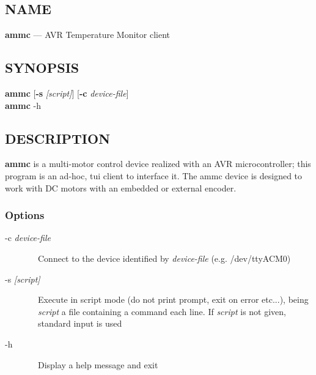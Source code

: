 \subsection*{NAME}
\textbf{ammc} — AVR Temperature Monitor client

\subsection*{SYNOPSIS}
\textbf{ammc} [\textbf{-s} \emph{[script]}] [\textbf{-c} \emph{device-file}] \\
\textbf{ammc} -h

\subsection*{DESCRIPTION}
\textbf{ammc} is a multi-motor control device realized with an AVR microcontroller;
this program is an ad-hoc, tui client to interface it.  
The ammc device is designed to work with DC motors with an embedded or external
encoder.

\subsubsection*{Options}
\begin{description}
\item[-c \emph{device-file}]
\ \ Connect to the device identified by \emph{device-file} (e.g. /dev/ttyACM0)

\item[-s \emph{[script]}]
\ \ Execute in script mode (do not print prompt, exit on error etc...), being
\ \ \emph{script} a file containing a command each line. If \emph{script} is not given,
\ \ standard input is used

\item[-h]
\ \ Display a help message and exit
\end{description}

